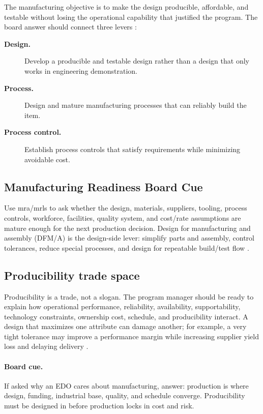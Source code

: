 \documentclass[../main.tex]{subfiles}
\begin{document}
The manufacturing objective is to make the design producible, affordable, and
testable without losing the operational capability that justified the program.
The board answer should connect three levers
\autocite{edo-3-7-1-manufacturing-producibility-2025,DoD-Producibility-Manufacturability-Guide-2024}:

\begin{description}
  \item[\textbf{Design.}] Develop a producible and testable design rather than a design that only works in engineering demonstration.
  \item[\textbf{Process.}] Design and mature manufacturing processes that can reliably build the item.
  \item[\textbf{Process control.}] Establish process controls that satisfy requirements while minimizing avoidable cost.
\end{description}

\subsection{Manufacturing Readiness Board Cue}

Use \ac{mra}/\acp{mrl} to ask whether the design, materials, suppliers, tooling,
process controls, workforce, facilities, quality system, and cost/rate assumptions
are mature enough for the next production decision.  Design for manufacturing
and assembly (DFM/A) is the design-side
lever: simplify parts and assembly, control tolerances, reduce special processes,
and design for repeatable build/test flow
\autocite{DoD-MRL-Deskbook-2025,DoD-Producibility-Manufacturability-Guide-2024,DAU-Manufacturing-Quality}.

\subsection{Producibility trade space}

Producibility is a trade, not a slogan.  The program manager should be ready to
explain how operational performance, reliability, availability, supportability,
technology constraints, ownership cost, schedule, and producibility interact.
A design that maximizes one attribute can damage another; for example, a very
tight tolerance may improve a performance margin while increasing supplier
yield loss and delaying delivery
\autocite{edo-3-7-1-manufacturing-producibility-2025,DoD-Producibility-Manufacturability-Guide-2024}.

\paragraph{Board cue.}
If asked why an EDO cares about manufacturing, answer: production is where
design, funding, industrial base, quality, and schedule converge.  Producibility
must be designed in before production locks in cost and risk.
\end{document}
